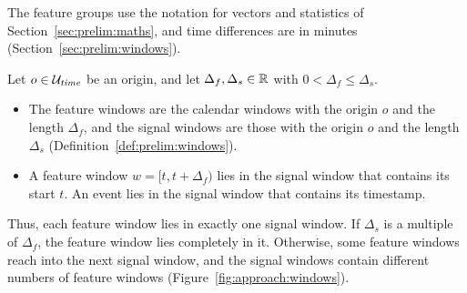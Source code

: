 The feature groups use the notation for vectors and statistics of Section~\ref{sec:prelim:maths}, and time differences are in minutes (Section~\ref{sec:prelim:windows}).

\begin{definition}
	\label{def:approach:window_roles}
	Let $o \in \mathcal{U}_{\mathit{time}}$ be an origin, and let $\Delta_f, \Delta_s \in \mathbb R$ with $0 < \Delta_f \le \Delta_s$.
	\begin{itemize}
		\item The feature windows are the calendar windows with the origin $o$ and the length $\Delta_f$, and the signal windows are those with the origin $o$ and the length $\Delta_s$ (Definition~\ref{def:prelim:windows}).
		\item A feature window $w = [t, t + \Delta_f)$ lies in the signal window that contains its start $t$. An event lies in the signal window that contains its timestamp.
	\end{itemize}
\end{definition}

Thus, each feature window lies in exactly one signal window. If $\Delta_s$ is a multiple of $\Delta_f$, the feature window lies completely in it. Otherwise, some feature windows reach into the next signal window, and the signal windows contain different numbers of feature windows (Figure~\ref{fig:approach:windows}).

